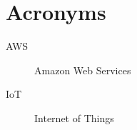 
\cleardoublepage
\chapter{Acronyms}
\begin{description}
\item[AWS] Amazon Web Services
\item[IoT] Internet of Things
\end{description}

